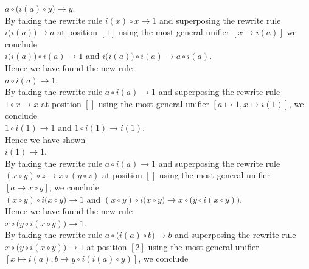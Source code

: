 $a \circ \bigl(i(a) \circ y\bigr) \rightarrow y$.
\\[0.2cm]
By taking the rewrite rule $i(x) \circ x \rightarrow 1$ and superposing the rewrite rule $i\bigl(i(a)\bigr) \rightarrow a$ at position
$[1]$ using the most general unifier $[x \mapsto i(a)]$ we conclude
\\[0.2cm]
\hspace*{1.3cm}
$i\bigl(i(a)\bigr) \circ i(a) \rightarrow 1$ \quad and \quad
$i\bigl(i(a)\bigr) \circ i(a) \rightarrow a \circ i(a)$.
\\[0.2cm]
Hence we have found the new rule
\\[0.2cm]
\hspace*{1.3cm}
$a \circ i(a) \rightarrow 1$.
\\[0.2cm]
By taking the rewrite rule $a \circ i(a) \rightarrow 1$ and superposing the rewrite rule $1 \circ x \rightarrow x$ at position $[]$ using
the most general unifier $[a \mapsto 1, x \mapsto i(1)]$, we conclude
\\[0.2cm]
\hspace*{1.3cm}
$1 \circ i(1) \rightarrow 1$ \quad and \quad $1 \circ i(1) \rightarrow i(1)$.
\\[0.2cm]
Hence we have shown
\\[0.2cm]
\hspace*{1.3cm}
$i(1) \rightarrow 1$.
\\[0.2cm]
By taking the rewrite rule $a \circ i(a) \rightarrow 1$ and superposing the rewrite rule $(x \circ y) \circ z \rightarrow x \circ (y \circ z)$
at position $[]$ using the most general unifier $[a \mapsto x \circ y]$,
 we conclude
\\[0.2cm]
\hspace*{1.3cm}
$(x \circ y) \circ i\bigl(x \circ y) \rightarrow 1$ \quad and \quad
$(x \circ y) \circ i\bigl(x \circ y) \rightarrow x \circ \bigl(y \circ i(x \circ y)\bigr)$.
\\[0.2cm]
Hence we have found the new rule
\\[0.2cm]
\hspace*{1.3cm}
$x \circ \bigl(y \circ i(x \circ y)\bigr) \rightarrow 1$.
\\[0.2cm]
By taking the rewrite rule $a \circ \bigl(i(a) \circ b\bigr) \rightarrow b$ and superposing the rewrite rule 
$x \circ \bigl(y \circ i(x \circ y)\bigr) \rightarrow 1$ at position $[2]$ using the most general unifier
$[x \mapsto i(a), b \mapsto y \circ i(i(a) \circ y)]$, we conclude
\\[0.2cm]
\hspace*{1.3cm}
